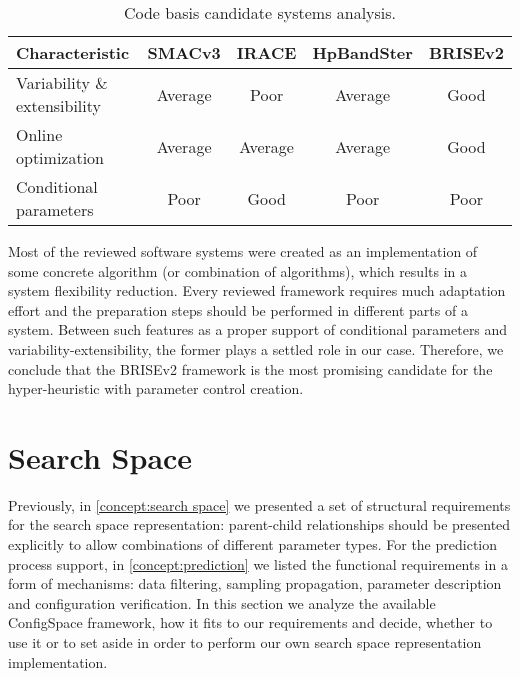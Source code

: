 \begin{table}[h!]
	\centering
	\begin{tabular}{l|cccc}
		\hline
		\rowcolor{gray!10}
		\textbf{Characteristic} & \textbf{SMACv3}& \textbf{IRACE} & \textbf{HpBandSter} & \textbf{BRISEv2} \\
		\hline
		Variability \& extensibility & \cellcolor{yellow!25}Average & \cellcolor{red!25}Poor & \cellcolor{yellow!25}Average & \cellcolor{green!25}Good \\
	
		Online optimization & \cellcolor{yellow!25}Average & \cellcolor{yellow!25}Average & \cellcolor{yellow!25}Average & \cellcolor{green!25}Good \\
	
		Conditional parameters & \cellcolor{red!25}Poor & \cellcolor{green!25}Good & \cellcolor{red!25}Poor & \cellcolor{red!25}Poor \\
		\hline
	\end{tabular}
	\caption{Code basis candidate systems analysis.}
	\label{iml: table code basis selection}
\end{table}

Most of the reviewed software systems were created as an implementation of some concrete algorithm (or combination of algorithms), which results in a system flexibility reduction. Every reviewed framework requires much adaptation effort and the preparation steps should be performed in different parts of a system. Between such features as a proper support of conditional parameters and variability-extensibility, the former plays a settled role in our case. Therefore, we conclude that the BRISEv2 framework is the most promising candidate for the hyper-heuristic with parameter control creation.

\section{Search Space}\label{impl: search space}
Previously, in \cref{concept:search space} we presented a set of structural requirements for the search space representation: parent-child relationships should be presented explicitly to allow combinations of different parameter types. For the prediction process support, in \cref{concept:prediction} we listed the functional requirements in a form of mechanisms: data filtering, sampling propagation, parameter description and configuration verification. In this section we analyze the available ConfigSpace framework, how it fits to our requirements and decide, whether to use it or to set aside in order to perform our own search space representation implementation.

